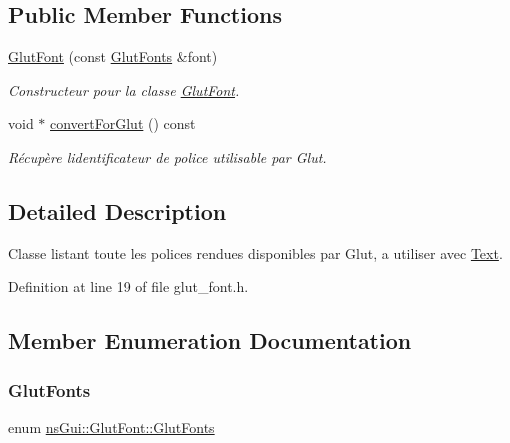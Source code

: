 \subsection*{Public Member Functions}
\begin{DoxyCompactItemize}
\item 
\hyperlink{classns_gui_1_1_glut_font_ac8e33c6ba8a95edcdcee4dd4d1a283ac}{Glut\+Font} (const \hyperlink{classns_gui_1_1_glut_font_aeeeb02d69e7dfc7e57957bd658c465ce}{Glut\+Fonts} \&font)
\begin{DoxyCompactList}\small\item\em Constructeur pour la classe \hyperlink{classns_gui_1_1_glut_font}{Glut\+Font}. \end{DoxyCompactList}\item 
void $\ast$ \hyperlink{classns_gui_1_1_glut_font_a10921b4183b246e9cfdebaca6b9e91a2}{convert\+For\+Glut} () const
\begin{DoxyCompactList}\small\item\em Récupère l\textquotesingle{}identificateur de police utilisable par Glut. \end{DoxyCompactList}\end{DoxyCompactItemize}


\subsection{Detailed Description}
Classe listant toute les polices rendues disponibles par Glut, a utiliser avec \hyperlink{classns_gui_1_1_text}{Text}. 

Definition at line 19 of file glut\+\_\+font.\+h.



\subsection{Member Enumeration Documentation}
\mbox{\label{classns_gui_1_1_glut_font_aeeeb02d69e7dfc7e57957bd658c465ce}} 
\subsubsection{\texorpdfstring{Glut\+Fonts}{GlutFonts}}
{\footnotesize\ttfamily enum \hyperlink{classns_gui_1_1_glut_font_aeeeb02d69e7dfc7e57957bd658c465ce}{ns\+Gui\+::\+Glut\+Font\+::\+Glut\+Fonts}}



